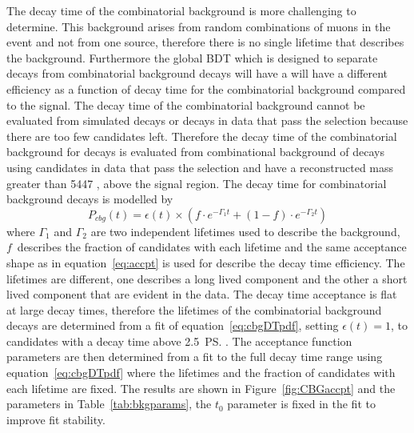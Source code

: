 {The decay time \pdf of the combinatorial background is more challenging to determine. This background arises from random combinations of muons in the event and not from one source, therefore there is no single lifetime that describes the background. Furthermore the global BDT which is designed to separate \bsmumu decays from combinatorial background decays will have a will have a different efficiency as a function of decay time for the combinatorial background compared to the \bsmum signal. The decay time \pdf of the combinatorial background cannot be evaluated from simulated decays or decays in data that pass the \bsmumu selection because there are too few candidates left. %
Therefore the decay time \pdf of the combinatorial background for \bsmumu decays is evaluated from combinational background of \bhh decays using candidates in data that pass the \bhh selection and have a reconstructed mass greater than 5447 \mevcc, above the \bs signal region. The decay time \pdf for combinatorial background decays is modelled by
\begin{equation}
P_{cbg}(t) = \epsilon(t)\times \left( f \cdot e^{-\Gamma_{1}t} + (1-f)\cdot e^{-\Gamma_{2}t} \right)
\label{eq:cbgDTpdf}
\end{equation}
where $\Gamma_{1}$ and $\Gamma_{2}$ are two independent lifetimes used to describe the background, $f$~describes the fraction of candidates with each lifetime and the same acceptance shape as in equation~\ref{eq:accpt} is used for describe the decay time efficiency. The lifetimes are different, one describes a long lived component and the other a short lived component that are evident in the data. The decay time acceptance is flat at large decay times, therefore the lifetimes of the combinatorial background decays are determined from a \ml fit of equation~\ref{eq:cbgDTpdf}, setting $\epsilon(t)=1$, to candidates with a decay time above 2.5~\ps. The acceptance function parameters are then determined from a \ml fit to the full decay time range using equation~\ref{eq:cbgDTpdf} where the lifetimes and the fraction of candidates with each lifetime are fixed. The results are shown in Figure~\ref{fig:CBGaccpt} and the \pdf parameters in Table~\ref{tab:bkgparams}, the $t_{0}$ parameter is fixed in the fit to improve fit stability. 
\begin{table}[htbp]
\begin{center}
\begin{tabular}{lc}

\end{tabular}
\end{center}
\end{table}}
